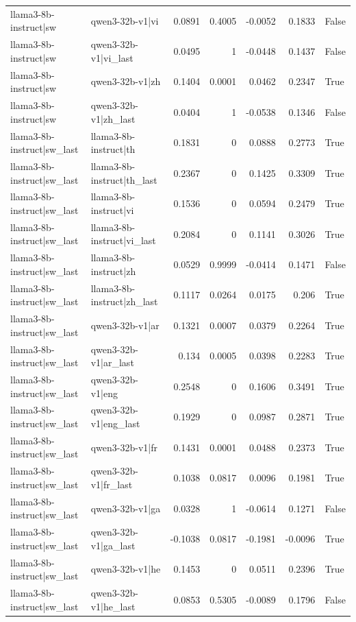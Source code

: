 \begin{table}
\begin{tabular}{l l r r r r l}
llama3-8b-instruct|sw & qwen3-32b-v1|vi & 0.0891 & 0.4005 & -0.0052 & 0.1833 & False \\
llama3-8b-instruct|sw & qwen3-32b-v1|vi_last & 0.0495 & 1 & -0.0448 & 0.1437 & False \\
llama3-8b-instruct|sw & qwen3-32b-v1|zh & 0.1404 & 0.0001 & 0.0462 & 0.2347 & True \\
llama3-8b-instruct|sw & qwen3-32b-v1|zh_last & 0.0404 & 1 & -0.0538 & 0.1346 & False \\
llama3-8b-instruct|sw_last & llama3-8b-instruct|th & 0.1831 & 0 & 0.0888 & 0.2773 & True \\
llama3-8b-instruct|sw_last & llama3-8b-instruct|th_last & 0.2367 & 0 & 0.1425 & 0.3309 & True \\
llama3-8b-instruct|sw_last & llama3-8b-instruct|vi & 0.1536 & 0 & 0.0594 & 0.2479 & True \\
llama3-8b-instruct|sw_last & llama3-8b-instruct|vi_last & 0.2084 & 0 & 0.1141 & 0.3026 & True \\
llama3-8b-instruct|sw_last & llama3-8b-instruct|zh & 0.0529 & 0.9999 & -0.0414 & 0.1471 & False \\
llama3-8b-instruct|sw_last & llama3-8b-instruct|zh_last & 0.1117 & 0.0264 & 0.0175 & 0.206 & True \\
llama3-8b-instruct|sw_last & qwen3-32b-v1|ar & 0.1321 & 0.0007 & 0.0379 & 0.2264 & True \\
llama3-8b-instruct|sw_last & qwen3-32b-v1|ar_last & 0.134 & 0.0005 & 0.0398 & 0.2283 & True \\
llama3-8b-instruct|sw_last & qwen3-32b-v1|eng & 0.2548 & 0 & 0.1606 & 0.3491 & True \\
llama3-8b-instruct|sw_last & qwen3-32b-v1|eng_last & 0.1929 & 0 & 0.0987 & 0.2871 & True \\
llama3-8b-instruct|sw_last & qwen3-32b-v1|fr & 0.1431 & 0.0001 & 0.0488 & 0.2373 & True \\
llama3-8b-instruct|sw_last & qwen3-32b-v1|fr_last & 0.1038 & 0.0817 & 0.0096 & 0.1981 & True \\
llama3-8b-instruct|sw_last & qwen3-32b-v1|ga & 0.0328 & 1 & -0.0614 & 0.1271 & False \\
llama3-8b-instruct|sw_last & qwen3-32b-v1|ga_last & -0.1038 & 0.0817 & -0.1981 & -0.0096 & True \\
llama3-8b-instruct|sw_last & qwen3-32b-v1|he & 0.1453 & 0 & 0.0511 & 0.2396 & True \\
llama3-8b-instruct|sw_last & qwen3-32b-v1|he_last & 0.0853 & 0.5305 & -0.0089 & 0.1796 & False \\

\end{tabular}
\end{table}
